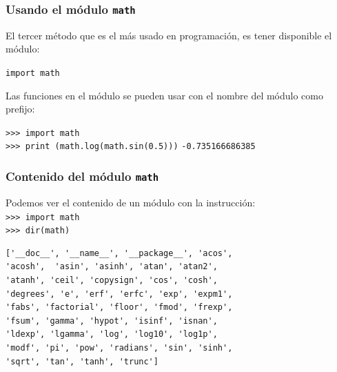 \begin{frame}[fragile]
\frametitle{Usando el módulo \texttt{math}}
El tercer método que es el más usado en programación, es tener disponible el módulo:
\begin{center}
\verb|import math|
\end{center}
Las funciones en el módulo se pueden usar con el nombre del módulo como prefijo:
\begin{exampleblock}{}
\verb|>>> import math| \\
\verb|>>> print (math.log(math.sin(0.5)))|
\verb|-0.735166686385|
\end{exampleblock}
\end{frame}
\begin{frame}[fragile]
\frametitle{Contenido del módulo \texttt{math}}
Podemos ver el contenido de un módulo con la instrucción:
\\
\verb|>>> import math| \\
\verb|>>> dir(math)|
\fontsize{10}{10}\selectfont
\begin{verbatim}
['__doc__', '__name__', '__package__', 'acos',
'acosh',  'asin', 'asinh', 'atan', 'atan2',
'atanh', 'ceil', 'copysign', 'cos', 'cosh',
'degrees', 'e', 'erf', 'erfc', 'exp', 'expm1',
'fabs', 'factorial', 'floor', 'fmod', 'frexp',
'fsum', 'gamma', 'hypot', 'isinf', 'isnan',
'ldexp', 'lgamma', 'log', 'log10', 'log1p',
'modf', 'pi', 'pow', 'radians', 'sin', 'sinh',
'sqrt', 'tan', 'tanh', 'trunc']
\end{verbatim}
\end{frame}
